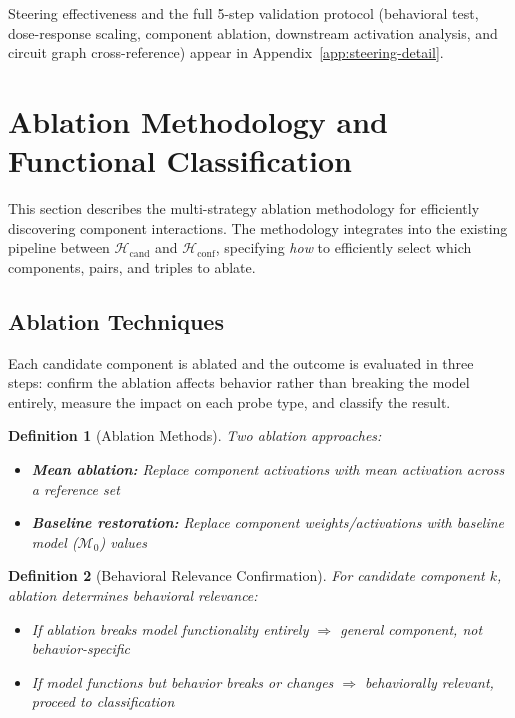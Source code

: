 \documentclass[11pt]{article}
\newtheorem{definition}{Definition}[section]
\begin{document}
Steering effectiveness and the full 5-step validation protocol (behavioral test, dose-response scaling, component ablation, downstream activation analysis, and circuit graph cross-reference) appear in Appendix~\ref{app:steering-detail}.

\section{Ablation Methodology and Functional Classification}
\label{sec:ablation}

This section describes the multi-strategy ablation methodology for efficiently discovering component interactions. The methodology integrates into the existing pipeline between $\mathcal{H}_{\text{cand}}$ and $\mathcal{H}_{\text{conf}}$, specifying \emph{how} to efficiently select which components, pairs, and triples to ablate.

\subsection{Ablation Techniques}
\label{sec:ablation-techniques}

Each candidate component is ablated and the outcome is evaluated in three steps: confirm the ablation affects behavior rather than breaking the model entirely, measure the impact on each probe type, and classify the result.

\begin{definition}[Ablation Methods]
\label{def:ablation-methods}
Two ablation approaches:
\begin{itemize}[nosep]
\item \textbf{Mean ablation:} Replace component activations with mean activation across a reference set
\item \textbf{Baseline restoration:} Replace component weights/activations with baseline model ($\mathcal{M}_0$) values
\end{itemize}
\end{definition}

\begin{definition}[Behavioral Relevance Confirmation]
\label{def:behavioral-relevance-confirmation}
For candidate component $k$, ablation determines behavioral relevance:
\begin{itemize}[nosep]
\item If ablation breaks model functionality entirely $\Rightarrow$ general component, not behavior-specific
\item If model functions but behavior breaks or changes $\Rightarrow$ behaviorally relevant, proceed to classification
\end{itemize}
\end{definition}
\end{document}

